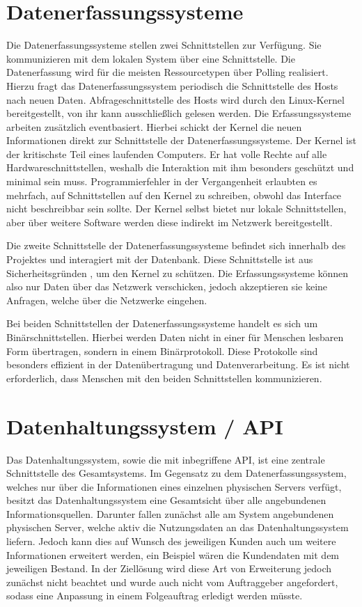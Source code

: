 \section{Datenerfassungssysteme}
Die Datenerfassungssysteme stellen zwei Schnittstellen zur Verfügung. Sie
kommunizieren mit dem lokalen System über eine
 Schnittstelle. Die Datenerfassung wird
für die meisten Ressourcetypen über Polling realisiert. Hierzu fragt das
Datenerfassungssystem periodisch die Schnittstelle des Hosts nach neuen Daten.
Abfrageschnittstelle des Hosts wird durch den Linux-Kernel bereitgestellt, von
ihr kann ausschließlich gelesen werden. Die Erfassungssysteme arbeiten
zusätzlich eventbasiert. Hierbei schickt der Kernel die neuen Informationen
direkt zur Schnittstelle der Datenerfassungssysteme. Der Kernel ist der
kritischste Teil eines laufenden Computers. Er hat volle Rechte auf alle
Hardwareschnittstellen, weshalb die Interaktion mit ihm besonders geschützt und
minimal sein muss. Programmierfehler in der Vergangenheit erlaubten es
mehrfach, auf Schnittstellen auf den Kernel zu schreiben, obwohl das Interface
nicht beschreibbar sein sollte. Der Kernel selbst bietet nur lokale
Schnittstellen, aber über weitere Software werden diese indirekt im Netzwerk
bereitgestellt.

Die zweite Schnittstelle der Datenerfassungssysteme befindet sich innerhalb des
Projektes und interagiert mit der Datenbank. Diese Schnittstelle ist aus
Sicherheitsgründen , um den Kernel zu
schützen. Die Erfassungssysteme können also nur Daten über das Netzwerk
verschicken, jedoch akzeptieren sie keine Anfragen, welche über die Netzwerke
eingehen.

Bei beiden Schnittstellen der Datenerfassungssysteme handelt es sich um
Binärschnittstellen. Hierbei werden Daten nicht in einer für Menschen lesbaren
Form übertragen, sondern in einem Binärprotokoll. Diese Protokolle sind
besonders effizient in der Datenübertragung und Datenverarbeitung. Es ist nicht
erforderlich, dass Menschen mit den beiden Schnittstellen kommunizieren.
\tm%

\section{Datenhaltungssystem / API}
Das Datenhaltungssystem, sowie die mit inbegriffene API, ist eine zentrale
Schnittstelle des Gesamtsystems. Im Gegensatz zu dem Datenerfassungssystem,
welches nur über die Informationen eines einzelnen physischen Servers verfügt,
besitzt das Datenhaltungssystem eine Gesamtsicht über alle angebundenen
Informationsquellen. Darunter fallen zunächst alle am System angebundenen
physischen Server, welche aktiv die Nutzungsdaten an das Datenhaltungssystem
liefern. Jedoch kann dies auf Wunsch des jeweiligen Kunden auch um weitere
Informationen erweitert werden, ein Beispiel wären die Kundendaten mit dem
jeweiligen Bestand. In der Ziellösung wird diese Art von Erweiterung jedoch
zunächst nicht beachtet und wurde auch nicht vom Auftraggeber angefordert,
sodass eine Anpassung in einem Folgeauftrag erledigt werden müsste.

